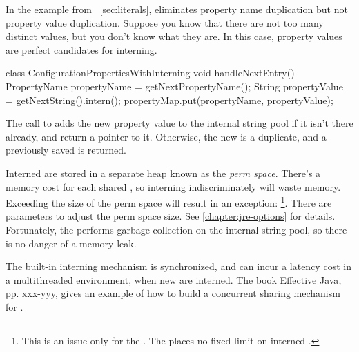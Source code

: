 In the example from ~\autoref{sec:literals},
 eliminates property
name duplication but not
property value duplication. Suppose you know that there are
not too many distinct values, but you don't know what they are. In this case,
property values are perfect candidates for interning.
\begin{shortlisting}
 
 class ConfigurationPropertiesWithInterning {
    void handleNextEntry() {
       PropertyName propertyName = getNextPropertyName(); 
       String propertyValue = getNextString().intern();
       propertyMap.put(propertyName, propertyValue);
    }
}
\end{shortlisting}

The call to  adds the new property value 
 to the internal string
pool if it isn't there already, and return a pointer to it. Otherwise, the
new  is a duplicate, and a previously saved  is
returned.

Interned  are stored in a separate heap known as the
\emph{perm space}. There's a memory cost for each shared , so
interning  indiscriminately will waste memory. 
Exceeding the size of the perm space will result in an exception:
\footnote{This is an issue only for the \oracle \jre. The \ibm \jre places no
fixed limit on interned .}. There are parameters to adjust
the perm space size. See \autoref{chapter:jre-options} for details. 
 Fortunately, the \jre performs garbage collection on the
internal string pool, so there is no danger of a memory leak.

The built-in interning mechanism is synchronized, and can incur a latency cost
in a multithreaded environment, when new  are interned.
The book Effective Java\cite{EffectiveJavaBook}, pp. xxx-yyy, gives an example
of how to build a concurrent sharing mechanism for .

